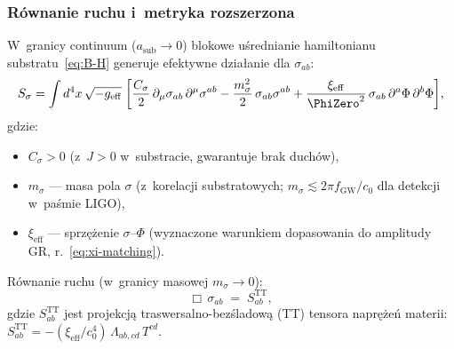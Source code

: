 \subsubsection{R\'ownanie ruchu i~metryka rozszerzona}

\begin{proposition}\label{prop:sigma-eom}
W~granicy continuum ($a_{\mathrm{sub}} \to 0$)
blokowe u\'srednianie hamiltonianu substratu~\eqref{eq:B-H}
generuje efektywne dzia\l{}anie dla $\sigma_{ab}$:
\begin{equation}\label{eq:S-sigma}
  S_\sigma = \int d^4x\,\sqrt{-g_{\mathrm{eff}}}\;
  \biggl[
    \frac{C_\sigma}{2}\,\partial_\mu\sigma_{ab}\,\partial^\mu\sigma^{ab}
    - \frac{m_\sigma^2}{2}\,\sigma_{ab}\sigma^{ab}
    + \frac{\xi_{\mathrm{eff}}}{\PhiZero^2}\,
      \sigma_{ab}\,\partial^a\Phi\,\partial^b\Phi
  \biggr],
\end{equation}
gdzie:
\begin{itemize}[nosep]
  \item $C_\sigma > 0$ (z~$J > 0$ w~substracie,
    gwarantuje brak duch\'ow),
  \item $m_\sigma$ --- masa pola $\sigma$
    (z~korelacji substratowych; $m_\sigma \lesssim
    2\pi f_{\mathrm{GW}}/c_0$ dla detekcji w~pa\'smie LIGO),
  \item $\xi_{\mathrm{eff}}$ --- sprz\k{e}\.zenie
    $\sigma$--$\Phi$ (wyznaczone warunkiem dopasowania
    do amplitudy GR, r.~\eqref{eq:xi-matching}).
\end{itemize}
R\'ownanie ruchu (w~granicy masowej $m_\sigma \to 0$):
\begin{equation}\label{eq:box-sigma}
  \boxed{
    \Box\,\sigma_{ab}
    \;=\; S_{ab}^{\mathrm{TT}},
  }
\end{equation}
gdzie $S_{ab}^{\mathrm{TT}}$ jest projekcj\k{a}
traswersalno-bez\'sladow\k{a} (TT) tensora
napr\k{e}\.ze\'n materii:
$S_{ab}^{\mathrm{TT}}
= -(\xi_{\mathrm{eff}}/c_0^4)\,
\Lambda_{ab,cd}\,T^{cd}$.
\end{proposition}


